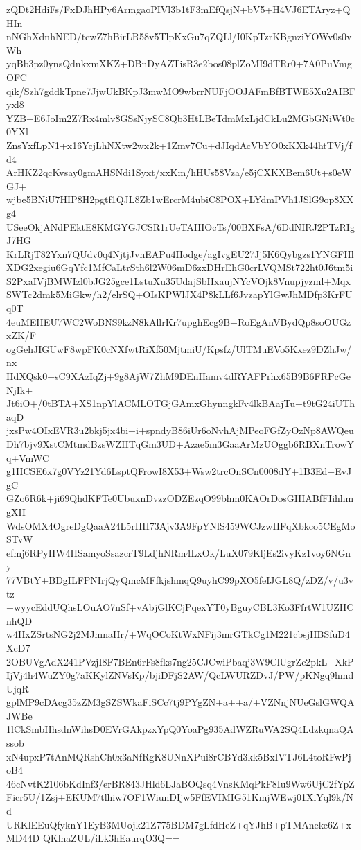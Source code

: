 zQDt2HdiFs/FxDJhHPy6ArmgaoPIVl3b1tF3mEfQsjN+bV5+H4VJ6ETAryz+QHIn
nNGhXdnhNED/tcwZ7hBirLR58v5TlpKxGu7qZQLl/I0KpTzrKBgnziYOWv0s0vWh
yqBb3pz0ynsQdnkxmXKZ+DBnDyAZTisR3e2bos08plZoMI9dTRr0+7A0PuVmgOFC
qik/Szh7gddkTpne7JjwUkBKpJ3mwMO9wbrrNUFjOOJAFmBfBTWE5Xu2AIBFyxl8
YZB+E6JoIm2Z7Rx4mlv8GSsNjySC8Qb3HtLBeTdmMxLjdCkLu2MGbGNiWt0c0YXl
ZnsYxfLpN1+x16YcjLhNXtw2wx2k+1Zmv7Cu+dJIqdAcVbYO0xKXk44htTVj/fd4
ArHKZ2qcKvsay0gmAHSNdi1Syxt/xxKm/hHUs58Vza/e5jCXKXBem6Ut+s0eWGJ+
wjbe5BNiU7HIP8H2pgtf1QJL8Zb1wErcrM4ubiC8POX+LYdmPVh1JSlG9op8XXg4
USeeOkjANdPEktE8KMGYGJCSR1rUeTAHIOcTs/00BXFsA/6DdNIRJ2PTzRIgJ7HG
KrLRjT82Yxn7QUdv0q4NjtjJvnEAPu4Hodge/agIvgEU27Jj5K6Qybgzs1YNGFHl
XDG2xegiu6GqYfc1MfCaLtrSth6l2W06mD6zxDHrEhG0crLVQMSt722ht0J6tm5i
S2PxaIVjBMWIzl0bJG25gce1LstuXu35UdajSbHxaujNYcVOjk8Vnupjyzml+Mqx
SWTc2dmk5MiGkw/h2/elrSQ+OIsKPWlJX4P8kLLf6JvzapYlGwJhMDfp3KrFUq0T
4euMEHEU7WC2WoBNS9kzN8kAllrKr7upghEcg9B+RoEgAnVBydQp8soOUGzxZK/F
ogGehJIGUwF8wpFK0cNXfwtRiXf50MjtmiU/Kpsfz/UlTMuEVo5Kxez9DZhJw/nx
HdXQsk0+sC9XAzIqZj+9g8AjW7ZhM9DEnHamv4dRYAFPrhx65B9B6FRPcGeNjIk+
Jt6iO+/0tBTA+XS1npYlACMLOTGjGAmxGhynngkFv4lkBAajTu+t9tG24iUThaqD
jxsPw4OIxEVR3u2bkj5jx4bi+i+spndyB86iUr6oNvhAjMPeoFGfZyOzNp8AWQeu
Dh7bjv9XstCMtmdBzsWZHTqGm3UD+Azae5m3GaaArMzUOggb6RBXnTrowYq+VmWC
g1HCSE6x7g0VYz21Yd6LsptQFrowI8X53+Wsw2trcOnSCn0008dY+1B3Ed+EvJgC
GZo6R6k+ji69QhdKFTe0UbuxnDvzzODZEzqO99bhm0KAOrDosGHIABfFIihhmgXH
WdsOMX4OgreDgQaaA24L5rHH73Ajv3A9FpYNlS459WCJzwHFqXbkco5CEgMoSTvW
efmj6RPyHW4HSamyoSsazcrT9LdjhNRm4LxOk/LuX079KljEs2ivyKz1voy6NGny
77VBtY+BDgILFPNIrjQyQmcMFfkjshmqQ9uyhC99pXO5feIJGL8Q/zDZ/v/u3vtz
+wyycEddUQhsLOuAO7nSf+vAbjGlKCjPqexYT0yBguyCBL3Ko3FfrtW1UZHCnhQD
w4HxZSrtsNG2j2MJmnaHr/+WqOCoKtWxNFij3mrGTkCg1M221cbsjHBSfuD4XcD7
2OBUVgAdX241PVzjI8F7BEn6rFs8fks7ng25CJCwiPbaqj3W9ClUgrZc2pkL+XkP
IjVj4h4WuZY0g7aKKylZNVsKp/bjiDFjS2AW/QcLWURZDvJ/PW/pKNgq9hmdUjqR
gplMP9cDAcg35zZM3gSZSWkaFiSCc7tj9PYgZN+a++a/+VZNnjNUeGslGWQAJWBe
1lCkSmbHhsdnWihsD0EVrGAkpzxYpQ0YoaPg935AdWZRuWA2SQ4LdzkqnaQAssob
xN4upxP7tAnMQRshCh0x3aNfRgK8UNnXPui8rCBYd3kk5BxIVTJ6L4toRFwPjoB4
46cNvtK2106bKdInf3/erBR843JHld6LJaBOQsq4VnsKMqPkF8Iu9Ww6UjC2fYpZ
Ficr5U/1Zsj+EKUM7tlhiw7OF1WiunDIjw5FfEVIMIG51KmjWEwj01XiYql9k/Nd
URKlEEuQfyknY1EyB3MUojk21Z775BDM7gLfdHeZ+qYJhB+pTMAneke6Z+xMD44D
QKlhaZUL/iLk3hEaurqO3Q==
